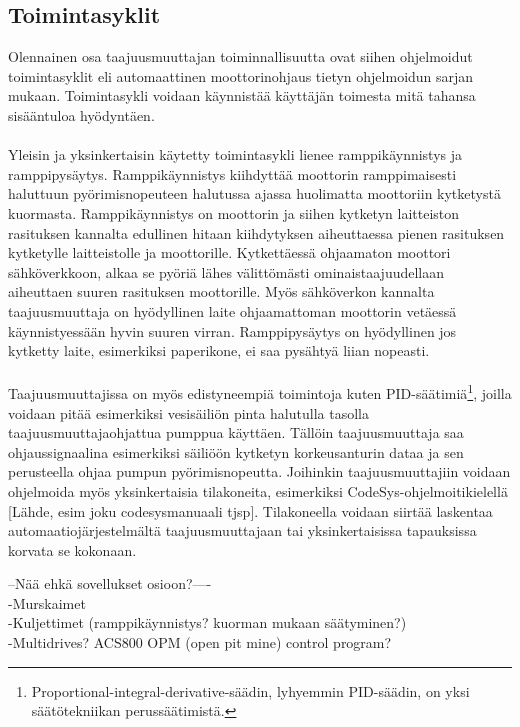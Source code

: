 \documentclass[finnish,12pt,a4paper,pdftex,elec,utf8]{aaltothesis}
\begin{document}
\subsection{Toimintasyklit}
Olennainen osa taajuusmuuttajan toiminnallisuutta ovat siihen ohjelmoidut toimintasyklit eli automaattinen moottorinohjaus tietyn ohjelmoidun sarjan mukaan. Toimintasykli voidaan käynnistää käyttäjän toimesta mitä tahansa sisääntuloa hyödyntäen. 
\\\\
Yleisin ja yksinkertaisin käytetty toimintasykli lienee ramppikäynnistys ja ramppipysäytys. Ramppikäynnistys kiihdyttää moottorin ramppimaisesti haluttuun pyörimisnopeuteen halutussa ajassa huolimatta moottoriin kytketystä kuormasta.
Ramppikäynnistys on moottorin ja siihen kytketyn laitteiston rasituksen kannalta edullinen hitaan kiihdytyksen aiheuttaessa pienen rasituksen kytketylle laitteistolle ja moottorille. Kytkettäessä ohjaamaton moottori sähköverkkoon, alkaa se pyöriä lähes välittömästi ominaistaajuudellaan aiheuttaen suuren rasituksen moottorille. Myös sähköverkon kannalta taajuusmuuttaja on hyödyllinen laite ohjaamattoman moottorin vetäessä käynnistyessään hyvin suuren virran. Ramppipysäytys on hyödyllinen jos kytketty laite, esimerkiksi paperikone, ei saa pysähtyä liian nopeasti. 
\\\\
Taajuusmuuttajissa on myös edistyneempiä toimintoja kuten PID-säätimiä\footnote{Proportional-integral-derivative-säädin, lyhyemmin PID-säädin, on yksi säätötekniikan perussäätimistä.}, joilla voidaan pitää esimerkiksi vesisäiliön pinta halutulla tasolla taajuusmuuttajaohjattua pumppua käyttäen. Tällöin taajuusmuuttaja saa ohjaussignaalina esimerkiksi säiliöön kytketyn korkeusanturin dataa ja sen perusteella ohjaa pumpun pyörimisnopeutta. Joihinkin taajuusmuuttajiin voidaan ohjelmoida myös yksinkertaisia tilakoneita, esimerkiksi CodeSys-ohjelmoitikielellä [Lähde, esim joku codesysmanuaali tjsp]. Tilakoneella voidaan siirtää laskentaa automaatiojärjestelmältä taajuusmuuttajaan tai yksinkertaisissa tapauksissa korvata se kokonaan.




--Nää ehkä sovellukset osioon?----\\
-Murskaimet \cite{Hulthen}\\
-Kuljettimet (ramppikäynnistys? kuorman mukaan säätyminen?)\\
-Multidrives? ACS800 OPM (open pit mine) control program?
\end{document}
